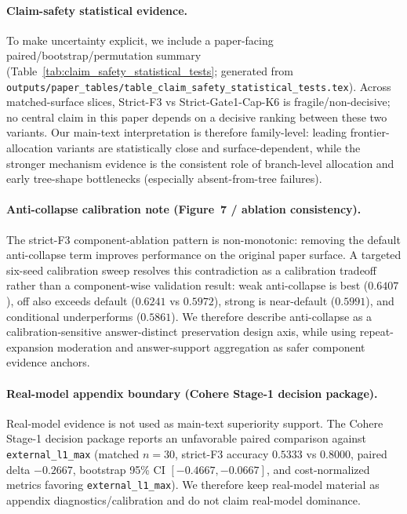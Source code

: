 \paragraph{Claim-safety statistical evidence.}
To make uncertainty explicit, we include a paper-facing paired/bootstrap/permutation summary (Table~\ref{tab:claim_safety_statistical_tests}; generated from \texttt{outputs/paper_tables/table\_claim\_safety\_statistical\_tests.tex}). Across matched-surface slices, Strict-F3 vs Strict-Gate1-Cap-K6 is fragile/non-decisive; no central claim in this paper depends on a decisive ranking between these two variants. Our main-text interpretation is therefore family-level: leading frontier-allocation variants are statistically close and surface-dependent, while the stronger mechanism evidence is the consistent role of branch-level allocation and early tree-shape bottlenecks (especially absent-from-tree failures).

\paragraph{Anti-collapse calibration note (Figure~7 / ablation consistency).}
The strict-F3 component-ablation pattern is non-monotonic: removing the default anti-collapse term improves performance on the original paper surface. A targeted six-seed calibration sweep resolves this contradiction as a calibration tradeoff rather than a component-wise validation result: weak anti-collapse is best (\(0.6407\)), off also exceeds default (\(0.6241\) vs \(0.5972\)), strong is near-default (\(0.5991\)), and conditional underperforms (\(0.5861\)). We therefore describe anti-collapse as a calibration-sensitive answer-distinct preservation design axis, while using repeat-expansion moderation and answer-support aggregation as safer component evidence anchors.

\paragraph{Real-model appendix boundary (Cohere Stage-1 decision package).}
Real-model evidence is not used as main-text superiority support. The Cohere Stage-1 decision package reports an unfavorable paired comparison against \texttt{external\_l1\_max} (matched \(n=30\), strict-F3 accuracy \(0.5333\) vs \(0.8000\), paired delta \(-0.2667\), bootstrap 95\% CI \([-0.4667,-0.0667]\), and cost-normalized metrics favoring \texttt{external\_l1\_max}). We therefore keep real-model material as appendix diagnostics/calibration and do not claim real-model dominance.
